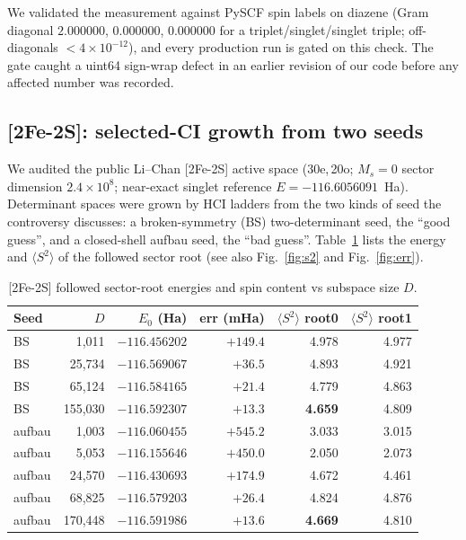 \documentclass[11pt]{article}
\newcommand{\ssq}{\ensuremath{\langle S^2\rangle}}
\begin{document}
We validated the measurement against PySCF spin labels on diazene (Gram diagonal $2.000000$, $0.000000$, $0.000000$ for a triplet/singlet/singlet triple; off-diagonals $<4\times10^{-12}$), and every production run is gated on this check. The gate caught a uint64 sign-wrap defect in an earlier revision of our code before any affected number was recorded.

\subsection{[2Fe-2S]: selected-CI growth from two seeds}\label{sec:fe2s2}

We audited the public Li--Chan [2Fe-2S] active space (30e,\,20o; $M_s=0$ sector dimension $2.4\times10^8$; near-exact singlet reference $E=-116.6056091$~Ha). Determinant spaces were grown by HCI ladders from the two kinds of seed the controversy discusses: a broken-symmetry (BS) two-determinant seed, the ``good guess'', and a closed-shell aufbau seed, the ``bad guess''. Table~\ref{tab:fe2s2} lists the energy and \ssq{} of the followed sector root (see also Fig.~\ref{fig:s2} and Fig.~\ref{fig:err}).

\begin{table}[ht]\centering\small
\caption{[2Fe-2S] followed sector-root energies and spin content vs subspace size $D$.}
\label{tab:fe2s2}
\begin{tabular}{lrrrrr}
\toprule
Seed & $D$ & $E_0$ (Ha) & err (mHa) & \ssq{} root0 & \ssq{} root1 \\
\midrule
BS & 1{,}011 & $-116.456202$ & $+149.4$ & 4.978 & 4.977 \\
BS & 25{,}734 & $-116.569067$ & $+36.5$ & 4.893 & 4.921 \\
BS & 65{,}124 & $-116.584165$ & $+21.4$ & 4.779 & 4.863 \\
BS & 155{,}030 & $-116.592307$ & $\mathbf{+13.3}$ & \textbf{4.659} & 4.809 \\
\midrule
aufbau & 1{,}003 & $-116.060455$ & $+545.2$ & 3.033 & 3.015 \\
aufbau & 5{,}053 & $-116.155646$ & $+450.0$ & 2.050 & 2.073 \\
aufbau & 24{,}570 & $-116.430693$ & $+174.9$ & 4.672 & 4.461 \\
aufbau & 68{,}825 & $-116.579203$ & $+26.4$ & 4.824 & 4.876 \\
aufbau & 170{,}448 & $-116.591986$ & $\mathbf{+13.6}$ & \textbf{4.669} & 4.810 \\
\bottomrule
\end{tabular}
\end{table}
\end{document}
